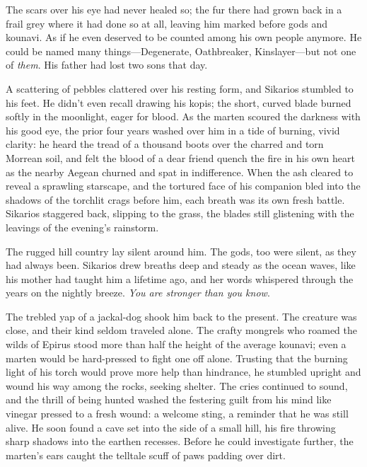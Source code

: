 The scars over his eye had never healed so; the fur there had grown back in a frail grey where it had done so at all, leaving him marked before gods and kounavi. As if he even deserved to be counted among his own people anymore. He could be named many things---Degenerate, Oathbreaker, Kinslayer---but not one of \emph{them}. His father had lost two sons that day.

A scattering of pebbles clattered over his resting form, and Sikarios stumbled to his feet. He didn't even recall drawing his kopis; the short, curved blade burned softly in the moonlight, eager for blood. As the marten scoured the darkness with his good eye, the prior four years washed over him in a tide of burning, vivid clarity: he heard the tread of a thousand boots over the charred and torn Morrean soil, and felt the blood of a dear friend quench the fire in his own heart as the nearby Aegean churned and spat in indifference. When the ash cleared to reveal a sprawling starscape, and the tortured face of his companion bled into the shadows of the torchlit crags before him, each breath was its own fresh battle. Sikarios staggered back, slipping to the grass, the blades still glistening with the leavings of the evening's rainstorm.

The rugged hill country lay silent around him. The gods, too were silent, as they had always been. Sikarios drew breaths deep and steady as the ocean waves, like his mother had taught him a lifetime ago, and her words whispered through the years on the nightly breeze. \emph{You are stronger than you know}.

The trebled yap of a jackal-dog shook him back to the present. The creature was close, and their kind seldom traveled alone. The crafty mongrels who roamed the wilds of Epirus stood more than half the height of the average kounavi; even a marten would be hard-pressed to fight one off alone. Trusting that the burning light of his torch would prove more help than hindrance, he stumbled upright and wound his way among the rocks, seeking shelter. The cries continued to sound, and the thrill of being hunted washed the festering guilt from his mind like vinegar pressed to a fresh wound: a welcome sting, a reminder that he was still alive. He soon found a cave set into the side of a small hill, his fire throwing sharp shadows into the earthen recesses. Before he could investigate further, the marten's ears caught the telltale scuff of paws padding over dirt.

